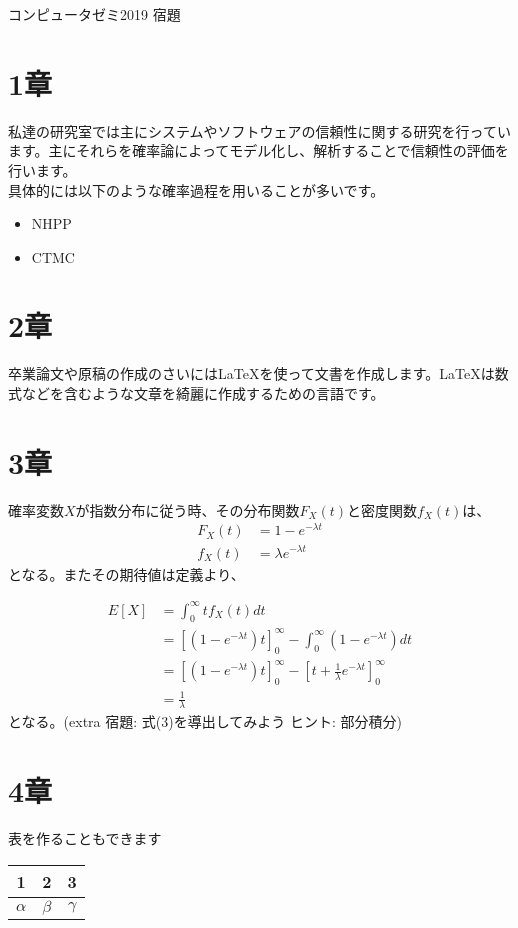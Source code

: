 \documentclass[a4paper,12pt]{article}
\begin{document}
\begin{center}
{\large コンピュータゼミ2019 宿題}
\end{center}
\section{1章}
私達の研究室では主にシステムやソフトウェアの信頼性に関する研究を行っています。主にそれらを確率論によってモデル化し、解析することで信頼性の評価を行います。\\
具体的には以下のような確率過程を用いることが多いです。
\begin{itemize}
\item NHPP
\item CTMC
\end{itemize}

\section{2章}
卒業論文や原稿の作成のさいには\LaTeX{}を使って文書を作成します。\LaTeX{}は数式などを含むような文章を綺麗に作成するための言語です。

\section{3章}
確率変数$X$が指数分布に従う時、その分布関数$F_X(t)$と密度関数$f_X(t)$は、
\begin{align}
F_X(t)  &=  1-e^{-\lambda t} \label{F_X}\\
f_X(t)  &=  \lambda e^{-\lambda t} \label{f_X}
\end{align}
となる。またその期待値は定義より、

\begin{align}
E[X] &=  \int^\infty _0 tf_X (t)dt \nonumber\\
&=  [(1-e^{-\lambda t})t]^\infty _0 - \int^\infty _0 (1-e^{-\lambda t})dt \nonumber\\
&=  [(1-e^{-\lambda t})t]^\infty _0 - [t+ \frac{1}{\lambda} e^{-\lambda t}]^\infty _0 \nonumber\\
&=  \frac{1}{\lambda} \label{E_X}
\end{align}
となる。(extra 宿題: 式(3)を導出してみよう ヒント: 部分積分)

\section{4章}
表を作ることもできます
\begin{center}
\begin{tabular}{|c|c|c|}\hline
 1 & 2 & 3 \\\hline
 $\alpha$&$\beta$&$\gamma$\\\hline
\end{tabular}
\end{center}
\end{document}
